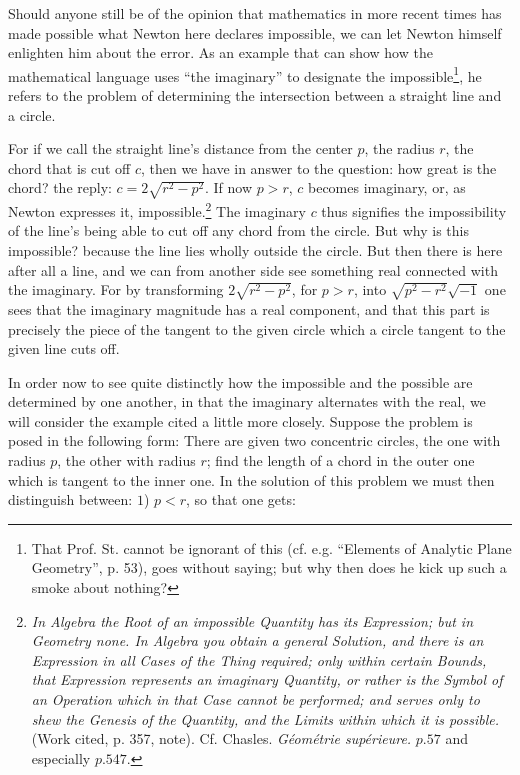 \documentclass[12pt,a4paper,openany]{book}
\newcommand{\opage}[1]{\marginnote{\footnotesize\textit{[#1]}}}
\begin{document}
Should anyone still be of the opinion that mathematics in more recent
times has made possible what Newton here declares
impossible, we can let Newton himself enlighten him about the error. As an example that can show how the mathematical language uses ``the imaginary'' to designate
the impossible\footnote{That Prof. St. cannot be ignorant of this (cf. e.g. ``Elements of Analytic Plane Geometry'', p. 53), goes
without saying; but why then does he kick up such a smoke about nothing?}, he refers to the problem of determining
the intersection between a straight line and a circle.

For if we call the straight line's distance from the center
$p$, the radius $r$, the chord that is cut off $c$, then we have
in answer to the question: how great is the chord? the reply:
$c = 2\sqrt{r^{2} - p^{2}}$. If now $p > r$, $c$ becomes imaginary,
or, as Newton expresses it, impossible.\footnote{\textit{In Algebra the Root of an impossible Quantity has}
\textit{its Expression; but in Geometry none. In Algebra you}
\textit{obtain a general Solution, and there is an Expression in all}
\textit{Cases of the Thing required; only within certain Bounds, that}
\textit{Expression represents an imaginary Quantity, or rather is the}
\textit{Symbol of an Operation which in that Case cannot be performed; and serves only to shew the Genesis of the}
\textit{Quantity, and the Limits within which it is possible.}
(Work cited, p. 357, note). Cf. Chasles. \textit{Géométrie supérieure.}
$p. 57$ and especially $p. 547$.} The imaginary $c$ thus signifies the impossibility of the line's being able
to cut off any chord from the circle. But why is
this impossible? because the line lies wholly outside the circle.
But then there is here after all a line, and we can from another
side see something real connected with the imaginary.
For by transforming $2\sqrt{r^{2} - p^{2}}$, for $p > r$, into
$\sqrt{p^{2} - r^{2}}\sqrt{-1}$ one sees that the imaginary magnitude
\opage{27}\setcounter{footnote}{0}%
has a real component, and that this part is precisely the
piece of the tangent to the given circle which a circle tangent to the given
line cuts off.

In order now to see quite distinctly how the impossible and
the possible are determined by one another, in that the imaginary
alternates with the real, we will consider the example cited
a little more closely. Suppose the problem is posed in the
following form: There are given two concentric circles, the
one with radius $p$, the other with radius $r$; find
the length of a chord in the outer one which is tangent to the
inner one. In the solution of this problem we must then distinguish
between:
$1$) $p < r$, so that one gets:
\end{document}
